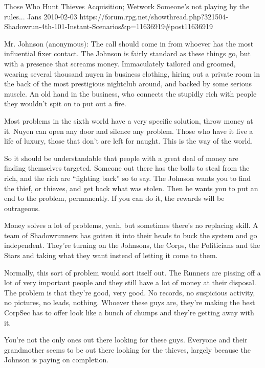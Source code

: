 \begin{scenario}{Those Who Hunt Thieves}
	{Acquisition; Wetwork}
	{Someone's not playing by the rules...}
	{Jans}
	{2010-02-03}
	{https://forum.rpg.net/showthread.php?321504-Shadowrun-4th-101-Instant-Scenarios\&p=11636919#post11636919}

Mr. Johnson (anonymous): The call should come in from whoever has the most influential fixer contact. The Johnson is fairly standard as these things go, but with a presence that screams money. Immaculately tailored and groomed, wearing several thousand nuyen in business clothing, hiring out a private room in the back of the most prestigious nightclub around, and backed by some serious muscle. An old hand in the business, who connects the stupidly rich with people they wouldn't spit on to put out a fire.

\synopsis 
Most problems in the sixth world have a very specific solution, throw money at it. Nuyen can open any door and silence any problem. Those who have it live a life of luxury, those that don't are left for naught. This is the way of the world.

So it should be understandable that people with a great deal of money are finding themselves targeted. Someone out there has the balls to steal from the rich, and the rich are ``fighting back'' so to say. The Johnson wants you to find the thief, or thieves, and get back what was stolen. Then he wants you to put an end to the problem, permanently. If you can do it, the rewards will be outrageous.

 Money solves a lot of problems, yeah, but sometimes there's no replacing skill. A team of Shadowrunners has gotten it into their heads to buck the system and go independent. They're turning on the Johnsons, the Corps, the Politicians and the Stars and taking what they want instead of letting it come to them.

Normally, this sort of problem would sort itself out. The Runners are pissing off a lot of very important people and they still have a lot of money at their disposal. The problem is that they're good, very good. No records, no suspicious activity, no pictures, no leads, nothing. Whoever these guys are, they're making the best CorpSec has to offer look like a bunch of chumps and they're getting away with it.

\twist You're not the only ones out there looking for these guys. Everyone and their grandmother seems to be out there looking for the thieves, largely because the Johnson is paying on completion.


\end{scenario}
